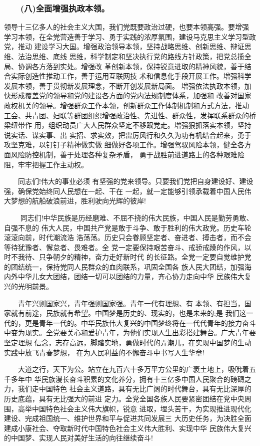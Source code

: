 \documentclass[11pt]{ctexart}
\begin{document}
{{{{\subsubsection{　　(八)全面增强执政本领。}
\label{sec:org11736b6}

领导十三亿多人的社会主义大国，我们党既要政治过硬，也要本领高强。要增强
学习本领，在全党营造善于学习、勇于实践的浓厚氛围，建设马克思主义学习型政党，推动
建设学习大国。增强政治领导本领，坚持战略思维、创新思维、辩证思维、法治思维、底线
思维，科学制定和坚决执行党的路线方针政策，把党总揽全局、协调各方落到实处。增强改
革创新本领，保持锐意进取的精神风貌，善于结合实际创造性推动工作，善于运用互联网技
术和信息化手段开展工作。增强科学发展本领，善于贯彻新发展理念，不断开创发展新局面。
增强依法执政本领，加快形成覆盖党的领导和党的建设各方面的党内法规制度体系，加强和
改善对国家政权机关的领导。增强群众工作本领，创新群众工作体制机制和方式方法，推动
工会、共青团、妇联等群团组织增强政治性、先进性、群众性，发挥联系群众的桥梁纽带作
用，组织动员广大人民群众坚定不移跟党走。增强狠抓落实本领，坚持说实话、谋实事、出
实招、求实效，把雷厉风行和久久为功有机结合起来，勇于攻坚克难，以钉钉子精神做实做
细做好各项工作。增强驾驭风险本领，健全各方面风险防控机制，善于处理各种复杂矛盾，
勇于战胜前进道路上的各种艰难险阻，牢牢把握工作主动权。

　　同志们!伟大的事业必须
有坚强的党来领导。只要我们党把自身建设好、建设强，确保党始终同人民想在一起、干在
一起，就一定能够引领承载着中国人民伟大梦想的航船破浪前进，胜利驶向光辉的彼岸!

　
　同志们!中华民族是历经磨难、不屈不挠的伟大民族，中国人民是勤劳勇敢、自强不息的
伟大人民，中国共产党是敢于斗争、敢于胜利的伟大政党。历史车轮滚滚向前，时代潮流浩
浩荡荡。历史只会眷顾坚定者、奋进者、搏击者，而不会等待犹豫者、懈怠者、畏难者。全
党一定要保持艰苦奋斗、戒骄戒躁的作风，以时不我待、只争朝夕的精神，奋力走好新时代
的长征路。全党一定要自觉维护党的团结统一，保持党同人民群众的血肉联系，巩固全国各
族人民大团结，加强海内外中华儿女大团结，团结一切可以团结的力量，齐心协力走向中华
民族伟大复兴的光明前景。

　　青年兴则国家兴，青年强则国家强。青年一代有理想、有
本领、有担当，国家就有前途，民族就有希望。中国梦是历史的、现实的，也是未来的;是
我们这一代的，更是青年一代的。中华民族伟大复兴的中国梦终将在一代代青年的接力奋斗
中变为现实。全党要关心和爱护青年，为他们实现人生出彩搭建舞台。广大青年要坚定理想
信念，志存高远，脚踏实地，勇做时代的弄潮儿，在实现中国梦的生动实践中放飞青春梦想，
在为人民利益的不懈奋斗中书写人生华章!

　　大道之行，天下为公。站立在九百六十多万平方公里的广袤土地上，吸吮着五千多年中
华民族漫长奋斗积累的文化养分，拥有十三亿多中国人民聚合的磅礴之力，我们走中国特色
社会主义道路，具有无比广阔的时代舞台，具有无比深厚的历史底蕴，具有无比强大的前进
定力。全党全国各族人民要紧密团结在党中央周围，高举中国特色社会主义伟大旗帜，锐意
进取，埋头苦干，为实现推进现代化建设、完成祖国统一、维护世界和平与促进共同发展三
大历史任务，为决胜全面建成小康社会、夺取新时代中国特色社会主义伟大胜利、实现中华
民族伟大复兴的中国梦、实现人民对美好生活的向往继续奋斗!



}}}}
\end{document}
